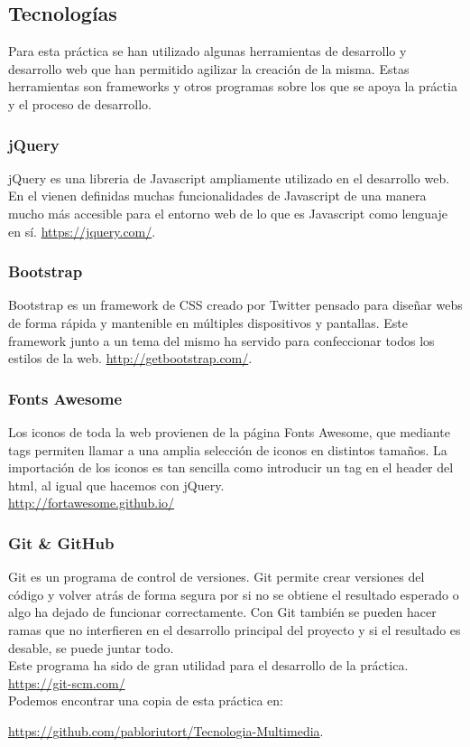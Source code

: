 \documentclass[11pt,a4paper]{article}
\begin{document}
\subsection{Tecnologías}
Para esta práctica se han utilizado algunas herramientas de desarrollo y desarrollo web que han permitido agilizar la creación de la misma. Estas herramientas son frameworks y otros programas sobre los que se apoya la práctia y el proceso de desarrollo.

\subsubsection{jQuery}
jQuery es una libreria de Javascript ampliamente utilizado en el desarrollo web. En el vienen definidas muchas funcionalidades de Javascript de una manera mucho más accesible para el entorno web de lo que es Javascript como lenguaje en sí.
\url{https://jquery.com/}.

\subsubsection{Bootstrap}
Bootstrap es un framework de CSS creado por Twitter pensado para diseñar webs de forma rápida y mantenible en múltiples dispositivos y pantallas. Este framework junto a un tema del mismo ha servido para confeccionar todos los estilos de la web. \url{http://getbootstrap.com/}.

\subsubsection{Fonts Awesome}
Los iconos de toda la web provienen de la página Fonts Awesome, que mediante tags permiten llamar a una amplia selección de iconos en distintos tamaños. La importación de los iconos es tan sencilla como introducir un tag en el header del html, al igual que hacemos con jQuery.\\ \url{http://fortawesome.github.io/}

\subsubsection{Git \& GitHub}
Git es un programa de control de versiones. Git permite crear versiones del código y volver atrás de forma segura por si no se obtiene el resultado esperado o algo ha dejado de funcionar correctamente. Con Git también se pueden hacer ramas que no interfieren en el desarrollo principal del proyecto y si el resultado es desable, se puede juntar todo.\\
Este programa ha sido de gran utilidad para el desarrollo de la práctica. \url{https://git-scm.com/}\\
Podemos encontrar una copia de esta práctica en:\\ 
\begin{center}
\url{https://github.com/pabloriutort/Tecnologia-Multimedia}.
\end{center}
\end{document}
